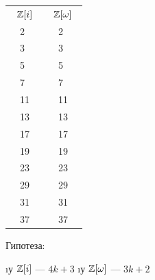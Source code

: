 \begin{solution}
\begin{table}[H]
\centering
\begin{tabular}{llllll}
\multicolumn{3}{c}{$\mathbb{Z}[i]$} & \multicolumn{3}{c}{$\mathbb{Z}[\omega]$} \\
        & 2      & \x     & \y       & 2        &          \\
\y      & 3      &        &          & 3        & \x       \\
        & 5      & \x     & \y       & 5        &          \\
\y      & 7      &        &          & 7        & \x       \\
\y      & 11     &        & \y       & 11       &          \\
        & 13     & \x     &          & 13       & \x       \\
        & 17     & \x     & \y       & 17       &          \\
\y      & 19     &        &          & 19       & \x       \\
\y      & 23     &        & \y       & 23       &          \\
        & 29     & \x     & \y       & 29       &          \\
\y      & 31     &        &          & 31       & \x       \\
        & 37     & \x     &          & 37       & \x        
\end{tabular}
\end{table}

Гипотеза:
\begin{itemize}
\i у \(\mathbb{Z}[i]\) --- \(4k+3\)
\i у \(\mathbb{Z}[\omega]\) --- \(3k+2\)
\end{itemize}
\end{solution}

\begin{problem}[14 (3.9)]
\end{problem}

